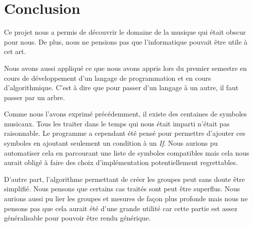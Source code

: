 \section{Conclusion}

Ce projet nous a permis de découvrir le domaine de la musique qui était obscur pour nous. De plus, nous ne pensions pas que l'informatique pouvait être utile à cet art.

\par
Nous avons aussi appliqué ce que nous avons appris lors du premier semestre en cours de développement d'un langage de programmation et en cours d'algorithmique. C'est à dire que pour passer d'un langage à un autre, il faut passer par un arbre.

\par
Comme nous l'avons exprimé précédemment, il existe des centaines de symboles musicaux. Tous les traiter dans le temps qui nous était imparti n'était pas raisonnable. Le programme a cependant été pensé pour permettre d'ajouter ces symboles en ajoutant seulement un condition à un \emph{If}. Nous aurions pu automatiser cela en parcourant une liste de symboles compatibles mais cela nous aurait obligé à faire des choix d'implémentation potentiellement regrettables.

\par
D'autre part, l'algorithme permettant de créer les groupes peut sans doute être simplifié. Nous pensons que certains cas traités sont peut être superflus. Nous aurions aussi pu lier les groupes et mesures de façon plus profonde mais nous ne pensons pas que cela aurait été d'une grande utilité car cette partie est assez généralisable pour pouvoir être rendu générique.
